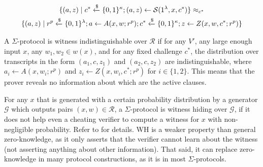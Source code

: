 \begin{definition}
\begin{enumerate}
    \begin{multline*}
        \{(a, z) \mid c^* \xleftarrow{\$} \{0,1\}^\kappa; (a,z) \leftarrow \mathcal S(1^\lambda,x,c^*)\} 
        \approx_{c^*} \\
        \{(a,z) \mid r^p \xleftarrow{\$} \{0,1\}^\lambda; a \leftarrow A(x,w;r^p); c^* \xleftarrow{\$} \{0,1\}^\kappa; z \leftarrow Z(x,w,c^*;r^p)\}
    \end{multline*}
\end{enumerate}
\end{definition}

\begin{definition}\label{def:wi}
A $\Sigma$-protocol is witness indistinguishable over $\mathcal R$ if for any $V'$, any large enough input $x$, any $w_1,w_2 \in w(x)$, and for any fixed challenge $c^*$, the distribution over transcripts in the form $(a_1, c, z_1)$ and $(a_2,c,z_2)$ are indistinguishable, where $a_i \leftarrow A(x,w_i;r^p)$ and $z_i \leftarrow Z(x,w_i, c^*; r^p)$ for $i \in \{1,2\}$. This means that the prover reveals no information about which are the active clauses. 
\end{definition}

\begin{definition}\label{def:wh}
For any $x$ that is generated with a certain probability distribution by a generator $\mathcal G$ which outputs pairs $(x,w) \in \mathcal R$, a $\Sigma$-protocol is witness hiding over $\mathcal G$, if it does not help even a cheating verifier to compute a witness for $x$ with non-negligible probability. Refer to \cite{10.1145/100216.100272} for details. WH is a weaker property than general zero-knowledge, as it only asserts that the verifier cannot learn about the witness (not asserting anything about other information). That said, it can replace zero-knowledge in many protocol constructions, as it is in most $\Sigma$-protocols.

\end{definition}

